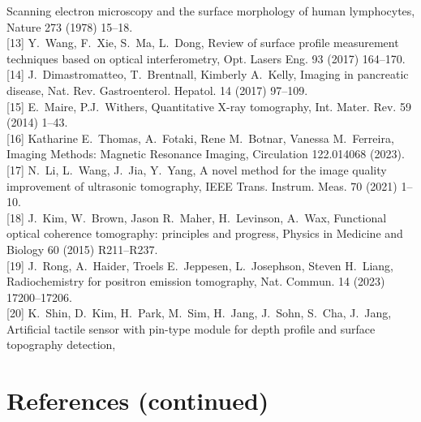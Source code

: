 \documentclass[11pt]{article}
\begin{document}
\begin{footnotesize}
Scanning electron microscopy and the surface morphology of human
lymphocytes, Nature 273 (1978) 15--18.\\[2pt]
[13] Y.~Wang, F.~Xie, S.~Ma, L.~Dong, Review of surface profile
measurement techniques based on optical interferometry, Opt. Lasers
Eng. 93 (2017) 164--170.\\[2pt]
[14] J.~Dimastromatteo, T.~Brentnall, Kimberly A.~Kelly, Imaging in
pancreatic disease, Nat. Rev. Gastroenterol. Hepatol. 14 (2017)
97--109.\\[2pt]
[15] E.~Maire, P.J.~Withers, Quantitative X-ray tomography, Int.
Mater. Rev. 59 (2014) 1--43.\\[2pt]
[16] Katharine E.~Thomas, A.~Fotaki, Rene M.~Botnar, Vanessa M.~Ferreira,
Imaging Methods: Magnetic Resonance Imaging, Circulation 122.014068
(2023).\\[2pt]
[17] N.~Li, L.~Wang, J.~Jia, Y.~Yang, A novel method for the image
quality improvement of ultrasonic tomography, IEEE Trans. Instrum.
Meas. 70 (2021) 1--10.\\[2pt]
[18] J.~Kim, W.~Brown, Jason R.~Maher, H.~Levinson, A.~Wax,
Functional optical coherence tomography: principles and progress,
Physics in Medicine and Biology 60 (2015) R211--R237.\\[2pt]
[19] J.~Rong, A.~Haider, Troels E.~Jeppesen, L.~Josephson,
Steven H.~Liang, Radiochemistry for positron emission tomography,
Nat. Commun. 14 (2023) 17200--17206.\\[2pt]
[20] K.~Shin, D.~Kim, H.~Park, M.~Sim, H.~Jang, J.~Sohn, S.~Cha,
J.~Jang, Artificial tactile sensor with pin-type module for depth
profile and surface topography detection,
\end{footnotesize}

\newpage

\setcounter{equation}{1}

\section*{References (continued)}
\end{document}
